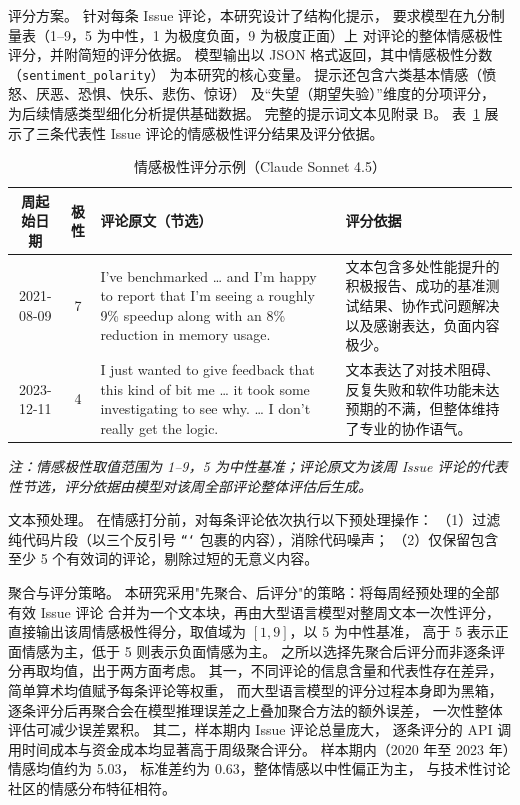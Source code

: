评分方案。
针对每条 Issue 评论，本研究设计了结构化提示，
要求模型在九分制量表（1--9，5 为中性，1 为极度负面，9 为极度正面）上
对评论的整体情感极性评分，并附简短的评分依据。
模型输出以 JSON 格式返回，其中情感极性分数（\texttt{sentiment\_polarity}）
为本研究的核心变量。
提示还包含六类基本情感（愤怒、厌恶、恐惧、快乐、悲伤、惊讶）
及“失望（期望失验）”维度的分项评分，
为后续情感类型细化分析提供基础数据。
完整的提示词文本见附录 B。
表~\ref{tab:sentiment-example} 展示了三条代表性 Issue 评论的情感极性评分结果及评分依据。

\begin{table}[htbp]
    \centering
    \caption{情感极性评分示例（Claude Sonnet 4.5）}
    \label{tab:sentiment-example}
    \small
    \begin{tabularx}{\textwidth}{c c >{\raggedright\arraybackslash}X >{\raggedright\arraybackslash}X}
        \toprule
        周起始日期 & 极性 & 评论原文（节选） & 评分依据 \\
        \midrule
        2021-08-09 & 7 &
        I've benchmarked \ldots{} and I'm happy to report that I'm seeing a roughly 9\% speedup along with an 8\% reduction in memory usage. &
        文本包含多处性能提升的积极报告、成功的基准测试结果、协作式问题解决以及感谢表达，负面内容极少。 \\
        \midrule
        2023-12-11 & 4 &
        I just wanted to give feedback that this kind of bit me \ldots{} it took some investigating to see why. \ldots{} I don't really get the logic. &
        文本表达了对技术阻碍、反复失败和软件功能未达预期的不满，但整体维持了专业的协作语气。 \\
        \bottomrule
    \end{tabularx}
    \par\vspace{4pt}
    {\small\textit{注：情感极性取值范围为 1--9，5 为中性基准；评论原文为该周 Issue 评论的代表性节选，评分依据由模型对该周全部评论整体评估后生成。}}
\end{table}

文本预处理。
在情感打分前，对每条评论依次执行以下预处理操作：
（1）过滤纯代码片段（以三个反引号 \texttt{```} 包裹的内容），消除代码噪声；
（2）仅保留包含至少 5 个有效词的评论，剔除过短的无意义内容。

聚合与评分策略。
本研究采用"先聚合、后评分"的策略：将每周经预处理的全部有效 Issue 评论
合并为一个文本块，再由大型语言模型对整周文本一次性评分，
直接输出该周情感极性得分，取值域为 $[1, 9]$，以 5 为中性基准，
高于 5 表示正面情感为主，低于 5 则表示负面情感为主。
之所以选择先聚合后评分而非逐条评分再取均值，出于两方面考虑。
其一，不同评论的信息含量和代表性存在差异，
简单算术均值赋予每条评论等权重，
而大型语言模型的评分过程本身即为黑箱，
逐条评分后再聚合会在模型推理误差之上叠加聚合方法的额外误差，
一次性整体评估可减少误差累积。
其二，样本期内 Issue 评论总量庞大，
逐条评分的 API 调用时间成本与资金成本均显著高于周级聚合评分。
样本期内（2020 年至 2023 年）情感均值约为 5.03，
标准差约为 0.63，整体情感以中性偏正为主，
与技术性讨论社区的情感分布特征相符。

